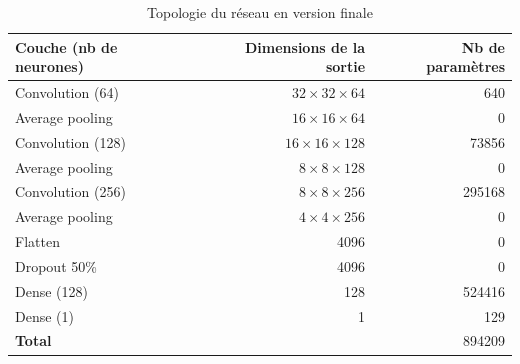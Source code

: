 \documentclass[a4paper, 11pt]{report}
\begin{document}
\begin{table}[h]
\centering
\caption{Topologie du réseau en version finale}
\begin{tabular}{ l r r }
	\hline
	\textbf{Couche (nb de neurones)} & \textbf{Dimensions de la sortie} & \textbf{Nb de paramètres} \\
	\hline\hline
	Convolution (64) & $32 \times 32 \times 64$ & 640 \\
	\hline
	Average pooling & $16 \times 16 \times 64$ & 0 \\
	\hline
	Convolution (128) & $16 \times 16 \times 128$ & 73856 \\
	\hline
	Average pooling & $8 \times 8 \times 128$ & 0 \\
	\hline
	Convolution (256) & $8 \times 8 \times 256$ & 295168 \\
	\hline
	Average pooling & $4 \times 4 \times 256$ & 0 \\
	\hline
	Flatten & 4096 & 0 \\
	\hline
	Dropout 50\% & 4096 & 0 \\
	\hline
	Dense (128) & 128 & 524416 \\
	\hline
	Dense (1) & 1 & 129 \\
	\hline\hline
	\textbf{Total} &  & 894209 \\
	\hline
\end{tabular}
\label{topologie}
\end{table}
\end{document}
